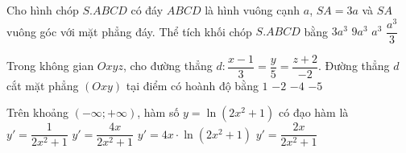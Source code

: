 \begin{ex}%
	Cho hình chóp $S.ABCD$ có đáy $ABCD$ là hình vuông cạnh $a$, $SA=3a$ và $SA$ vuông góc với mặt phẳng đáy. Thể tích khối chóp $S.ABCD$ bằng
	\choice
	{$3a^3$}
	{$9a^3$}
	{\True $a^3$}
	{$\dfrac{a^3}{3}$}
\end{ex}

\begin{ex}%
	Trong không gian $ Oxyz$, cho đường thẳng $d\colon\dfrac{x-1}{3}=\dfrac{y}{5}=\dfrac{z+2}{-2}$. Đường thẳng $d$ cắt mặt phẳng $\left(Oxy\right)$ tại điểm có hoành độ bằng
	\choice
	{$1$}
	{\True $-2$}
	{$-4$}
	{$-5$}
\end{ex}

\begin{ex}%
	Trên khoảng $\left(-\infty ;+\infty\right)$, hàm số $y=\ln\left(2x^2+1\right)$ có đạo hàm là
	\choice
	{$ y'=\dfrac{1}{2x^2+1}$}
	{\True $ y'=\dfrac{4x}{2x^2+1}$}
	{$ y'=4x\cdot\ln\left(2x^2+1\right)$}
	{$ y'=\dfrac{2x}{2x^2+1}$}
\end{ex}

